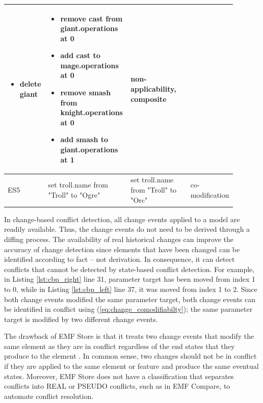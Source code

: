\begin{table}[ht]
\begin{tabular}{|p{0.04\linewidth}|p{0.37\linewidth}|p{0.37\linewidth}|
		p{0.11\linewidth}|}
\begin{minipage}[t]{\linewidth}
\begin{itemize}[leftmargin=0pt]
			\item[] delete giant
		\end{itemize}
	\end{minipage}
	& 
	\begin{minipage}[t]{\linewidth}
		\raggedright
		\begin{itemize}[leftmargin=0pt]
			\setlength
			\item[] remove cast from giant.operations at 0
			\item[] add cast to mage.operations at 0
			\item[] remove smash from knight.operations at 0
			\item[] add smash to giant.operations at 1
		\end{itemize}
	\end{minipage}
	& 
	non-applicability, composite\\
	\hline
	ES5 & 
	set troll.name from "Troll" to "Ogre" & 
	set troll.name from "Troll" to "Orc" & 
	co-modification\\ 
	\hline
\end{tabular}
\end{table}

In change-based conflict detection, all change events applied to a model are readily available. Thus, the change events do not need to be derived through a diffing process. The availability of real historical changes can improve the accuracy of change detection since elements that have been changed can be identified according to fact -- not derivation. In consequence, it can detect conflicts that cannot be detected by state-based conflict detection. For example, in Listing \ref{lst:cbp_right} line 31, parameter \textsf{target} has been moved from index 1 to 0, while in Listing \ref{lst:cbp_left} line 37, it was moved from index 1 to 2. Since both change events modified the same parameter \textsf{target}, both change events can be identified in conflict using (\ref{eq:change_comodifiabilty}); the same parameter \textsf{target} is modified by two different change events. 

The drawback of EMF Store is that it treats two change events that modify the same element as they are in conflict regardless of the end states that they produce to the element \cite{DBLP:conf/sfm/BroschKLSWW12}. In common sense, two changes should not be in conflict if they are applied to the same element or feature and produce the same eventual states. Moreover, EMF Store does not have a classification that separates conflicts into \textsf{REAL} or \textsf{PSEUDO} conflicts, such as in EMF Compare, to automate conflict resolution. 

